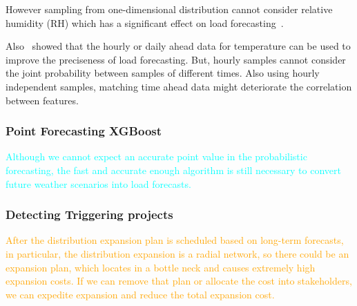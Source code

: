 \documentclass[journal]{IEEEtran} %
\begin{document}
However sampling from one-dimensional distribution cannot consider relative humidity (RH) which has a significant effect on load forecasting~\cite{Xie2016b}. 

Also~\cite{Xie2017a} showed that the hourly or daily ahead data for temperature can be used to improve the preciseness of load forecasting. But, hourly samples cannot consider the joint probability between samples of different times. Also using hourly independent samples, matching time ahead data might deteriorate the correlation between features.  












\subsubsection{Point Forecasting XGBoost}
\textcolor{cyan}{Although we cannot expect an accurate point value in the probabilistic forecasting, the fast and accurate enough algorithm is still necessary to convert future weather scenarios into load forecasts.}



\vspace{1.3in}

































\subsubsection{Detecting Triggering projects}
\textcolor{orange}{After the distribution expansion plan is scheduled based on long-term forecasts, in particular, the distribution expansion is a radial network, so there could be an expansion plan, which locates in a bottle neck and causes extremely high expansion costs. If we can remove that plan or allocate the cost into stakeholders, we can expedite expansion and reduce the total expansion cost. }
\end{document}
